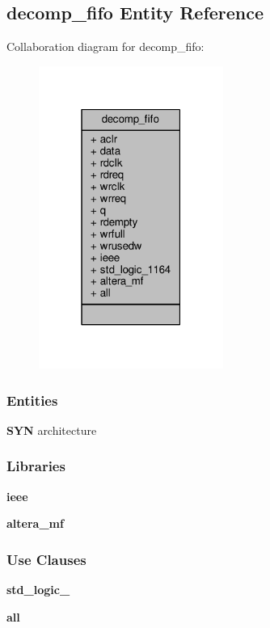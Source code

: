 \subsection{decomp\+\_\+fifo Entity Reference}
\label{classdecomp__fifo}


Collaboration diagram for decomp\+\_\+fifo\+:\nopagebreak
\begin{figure}[H]
\begin{center}
\leavevmode
\includegraphics[width=171pt]{d3/d1c/classdecomp__fifo__coll__graph}
\end{center}
\end{figure}
\subsubsection*{Entities}
\begin{DoxyCompactItemize}
\item 
{\bf S\+YN} architecture
\end{DoxyCompactItemize}
\subsubsection*{Libraries}
 \begin{DoxyCompactItemize}
\item 
{\bf ieee} 
\item 
{\bf altera\+\_\+mf} 
\end{DoxyCompactItemize}
\subsubsection*{Use Clauses}
 \begin{DoxyCompactItemize}
\item 
{\bf std\+\_\+logic\+\_}   
\item 
{\bf  all }   
\end{DoxyCompactItemize}
